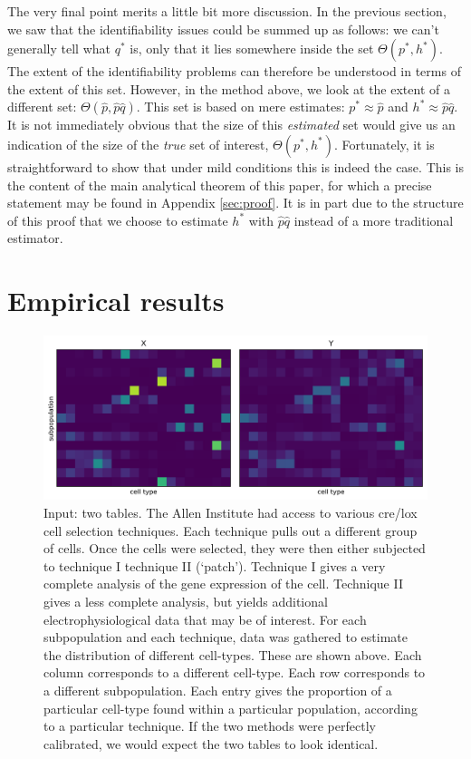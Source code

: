 The very final point merits a little bit more discussion.  In the previous section, we saw that the identifiability issues could be summed up as follows: we can't generally tell what $q^*$ is, only that it lies somewhere inside the set $\Theta(p^*,h^*)$.  The extent of the identifiability problems can therefore be understood in terms of the extent of this set.  However, in the method above, we look at the extent of a different set: $\Theta(\hat p,\hat p \hat q)$.  This set is based on mere estimates: $p^* \approx \hat p$ and $h^* \approx \hat p \hat q$.  It is not immediately obvious that the size of this \emph{estimated} set would give us an indication of the size of the \emph{true} set of interest, $\Theta(p^*,h^*)$.  Fortunately, it is straightforward to show that under mild conditions this is indeed the case.  This is the content of the main analytical theorem of this paper, for which a precise statement may be found in Appendix \ref{sec:proof}.  It is in part due to the structure of this proof that we choose to estimate $h^*$ with $\hat p \hat q$ instead of a more traditional estimator.

\section{Empirical results}

\begin{figure}
\hfill{}
\includegraphics[width=.5\textheight]{../images/plxy}
\hfill{}

\caption{Input: two tables.  The Allen Institute had access to various cre/lox cell selection techniques.  Each technique pulls out a different group of cells.  Once the cells were selected, they were then either subjected to technique I technique II (`patch').  Technique I gives a very complete analysis of the gene expression of the cell.  Technique II gives a less complete analysis, but yields additional electrophysiological data that may be of interest.  For each subpopulation and each technique, data was gathered to estimate the distribution of different cell-types.  These are shown above.  Each column corresponds to a different cell-type.  Each row corresponds to a different subpopulation.  Each entry gives the proportion of a particular cell-type found within a particular population, according to a particular technique.  If the two methods were perfectly calibrated, we would expect the two tables to look identical.  \label{fig:alleninput}}
\end{figure}

